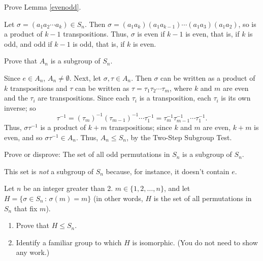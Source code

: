 \begin{exercise}
Prove Lemma \ref{evenodd}.
\end{exercise}

\begin{solution}[print=false]
Let $\sigma=(a_1a_2\cdots a_k)\in S_n$.  Then $\sigma=(a_1a_k)(a_1a_{k-1})\cdots (a_1a_3)(a_1a_2)$, so is a product of $k-1$ transpositions.  Thus, $\sigma$ is even if $k-1$ is even, that is, if $k$ is odd, and odd if $k-1$ is odd, that is, if $k$ is even.
\end{solution}

\begin{exercise}
Prove that $A_n$ is a subgroup of $S_n$.
\end{exercise}

\begin{solution}[print=false]
Since $e\in A_n$, $A_n\neq \emptyset$.  Next, let $\sigma, \tau \in A_n$.  Then $\sigma$ can be written as a product of $k$ transpositions and $\tau$ can be written as $\tau=\tau_1\tau_2\cdots \tau_m$, where $k$ and $m$ are even and the $\tau_i$ are transpositions. Since each $\tau_i$ is a transposition, each $\tau_i$ is its own inverse; so $$\tau^{-1}=(\tau_m)^{-1}(\tau_{m-1})^{-1}\cdots \tau_1^{-1}=\tau_m^{-1}\tau_{m-1}^{-1}\cdots \tau_1^{-1}.$$ Thus, $\sigma \tau^{-1}$ is a product of $k+m$ transpositions; since $k$ and $m$ are even, $k+m$ is even, and so $\sigma \tau^{-1}\in A_n$.  Thus, $A_n\leq S_n$, by the Two-Step Subgroup Test.
\end{solution}

\begin{exercise} Prove or disprove: The set of all odd permutations in $S_n$ is a subgroup of $S_n$.
\end{exercise}

\begin{solution}[print=false]
This set is \textit{not} a subgroup of $S_n$ because, for instance, it doesn't contain $e$.
\end{solution}

\begin{exercise}
Let $n$ be an integer greater than 2. $m \in \{1,2,\ldots,n\}$, and let $H=\{\sigma\in S_n\,:\,\sigma(m)=m\}$ (in other words, $H$ is the set of all permutations in $S_n$ that fix $m$).

\begin{enumerate}
\item Prove that $H\leq S_n$.
\item Identify a familiar group to which $H$ is isomorphic. (You do not need to show any work.)
\end{enumerate}
\end{exercise}


